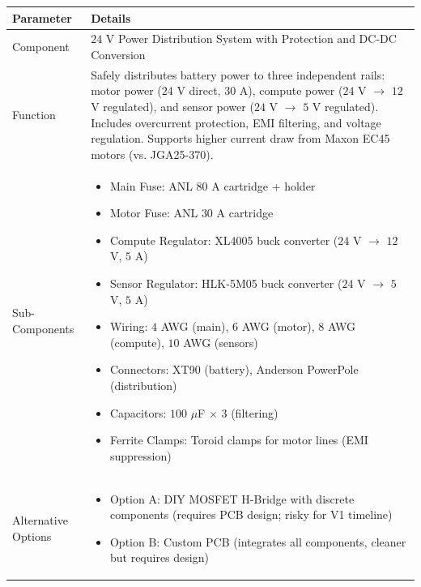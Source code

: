 \documentclass[12pt,a4paper]{article}
\begin{document}
\begin{longtable}{|p{4cm}|p{10cm}|}
\hline
\textbf{Parameter} & \textbf{Details} \\
\hline

Component &
$24$ V Power Distribution System with Protection and DC-DC Conversion \\
\hline

Function &
Safely distributes battery power to three independent rails: motor power ($24$ V direct, $30$ A), compute power ($24$ V $\rightarrow$ $12$ V regulated), and sensor power ($24$ V $\rightarrow$ $5$ V regulated). Includes overcurrent protection, EMI filtering, and voltage regulation. Supports higher current draw from Maxon EC45 motors (vs. JGA25-370). \\
\hline

Sub-Components &
\begin{itemize}
\item Main Fuse: ANL $80$ A cartridge + holder
\item Motor Fuse: ANL $30$ A cartridge
\item Compute Regulator: XL4005 buck converter ($24$ V $\rightarrow$ $12$ V, $5$ A)
\item Sensor Regulator: HLK-5M05 buck converter ($24$ V $\rightarrow$ $5$ V, $5$ A)
\item Wiring: $4$ AWG (main), $6$ AWG (motor), $8$ AWG (compute), $10$ AWG (sensors)
\item Connectors: XT90 (battery), Anderson PowerPole (distribution)
\item Capacitors: $100$ $\mu$F $\times$ $3$ (filtering)
\item Ferrite Clamps: Toroid clamps for motor lines (EMI suppression)
\end{itemize}
\\
\hline

Alternative Options &
\begin{itemize}
\item Option A: DIY MOSFET H-Bridge with discrete components (requires PCB design; risky for V1 timeline)
\item Option B: Custom PCB (integrates all components, cleaner but requires design)
\end{itemize}
\\
\hline


\end{longtable}
\end{document}
